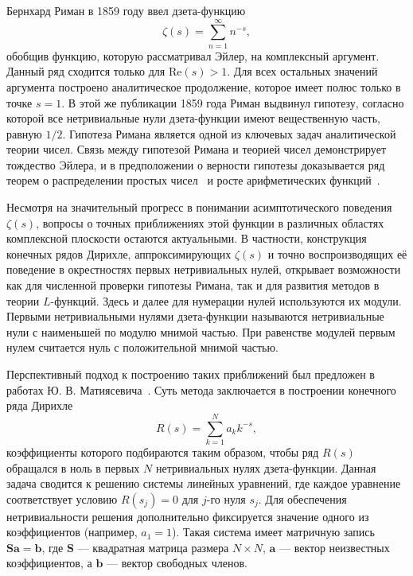 \documentclass[intlimits,twoside,a4paper,11pt]{article}
\begin{document}
        Бернхард Риман в 1859 году ввел дзета-функцию $$\zeta(s) = \sum_{n=1}^\infty n^{-s},$$ обобщив функцию,
        которую рассматривал Эйлер, на комплексный аргумент. Данный ряд сходится только для $\mathrm{Re}(s) > 1$.
        Для всех остальных значений аргумента построено аналитическое продолжение, которое имеет полюс только
        в точке $s = 1$. В этой же публикации 1859 года Риман выдвинул гипотезу, согласно которой
        все нетривиальные нули дзета-функции имеют вещественную часть, равную $1/2$. Гипотеза Римана
        является одной из ключевых задач аналитической теории чисел. Связь между гипотезой Римана и теорией чисел
        демонстрирует тождество Эйлера, и в предположении о верности гипотезы доказывается ряд теорем
        о распределении простых чисел~\cite{sviridov, matveenko} и росте арифметических функций~\cite{akim}.
       
        Несмотря на значительный прогресс в понимании асимптотического поведения $\zeta(s)$, 
        вопросы о точных приближениях этой функции в различных областях комплексной плоскости остаются актуальными. 
        В частности, конструкция конечных рядов Дирихле, аппроксимирующих $\zeta(s)$ и точно воспроизводящих 
        её поведение в окрестностях первых нетривиальных нулей, открывает возможности как для численной проверки 
        гипотезы Римана, так и для развития методов в теории $L$-функций. Здесь и далее для нумерации нулей используются их модули. 
        Первыми нетривиальными нулями дзета-функции называются нетривиальные нули с наименьшей по модулю мнимой частью. 
        При равенстве модулей первым нулем считается нуль с положительной мнимой частью.

        Перспективный подход к построению таких приближений был предложен в работах Ю. В. Матиясевича~\cite{Chernov2015, de430}. 
        Суть метода заключается в построении конечного ряда Дирихле 
        \begin{equation}
            R(s) = \sum_{k=1}^{N} a_{k} k^{-s},
        \end{equation}
        коэффициенты которого подбираются таким образом, чтобы ряд $R(s)$ обращался в ноль в первых $N$ нетривиальных нулях дзета-функции. 
        Данная задача сводится к решению системы линейных уравнений, где каждое уравнение соответствует условию 
        $R(s_j) = 0$ для $j$-го нуля $s_j$. Для обеспечения нетривиальности решения дополнительно фиксируется значение одного из коэффициентов 
        (например, $a_1=1$). Такая система имеет матричную запись $\mathbf{S} \mathbf{a} = \mathbf{b}$, 
        где $\mathbf{S}$ — квадратная матрица размера $N \times N$, $\mathbf{a}$ — вектор неизвестных коэффициентов, 
        а $\mathbf{b}$ — вектор свободных членов. 
\end{document}
